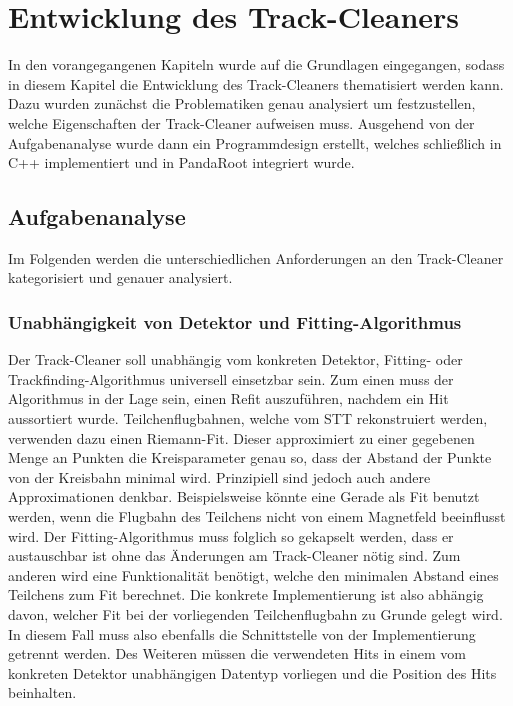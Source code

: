 \chapter{Entwicklung des Track-Cleaners}
In den vorangegangenen Kapiteln wurde auf die Grundlagen eingegangen, sodass in diesem Kapitel die Entwicklung des Track-Cleaners thematisiert werden kann. Dazu wurden zunächst die Problematiken genau analysiert um festzustellen, welche Eigenschaften der Track-Cleaner aufweisen muss. Ausgehend von der Aufgabenanalyse wurde dann ein Programmdesign erstellt, welches schließlich in C++ implementiert und in PandaRoot integriert wurde.

\section{Aufgabenanalyse}
Im Folgenden werden die unterschiedlichen Anforderungen an den Track-Cleaner kategorisiert und genauer analysiert.

\subsection{Unabhängigkeit von Detektor und Fitting-Algorithmus}
Der Track-Cleaner soll unabhängig vom konkreten Detektor, Fitting- oder Trackfinding-Algorithmus universell einsetzbar sein. Zum einen muss der Algorithmus in der Lage sein, einen Refit auszuführen, nachdem ein Hit aussortiert wurde. Teilchenflugbahnen, welche vom STT rekonstruiert werden, verwenden dazu einen Riemann-Fit. Dieser approximiert zu einer gegebenen Menge an Punkten die Kreisparameter genau so, dass der Abstand der Punkte von der Kreisbahn minimal wird. Prinzipiell sind jedoch auch andere Approximationen denkbar. Beispielsweise könnte eine Gerade als Fit benutzt werden, wenn die Flugbahn des Teilchens nicht von einem Magnetfeld beeinflusst wird. Der Fitting-Algorithmus muss folglich so gekapselt werden, dass er austauschbar ist ohne das Änderungen am Track-Cleaner nötig sind. Zum anderen wird eine Funktionalität benötigt, welche den minimalen Abstand eines Teilchens zum Fit berechnet. Die konkrete Implementierung ist also abhängig davon, welcher Fit bei der vorliegenden Teilchenflugbahn zu Grunde gelegt wird. In diesem Fall muss also ebenfalls die Schnittstelle von der Implementierung getrennt werden. Des Weiteren müssen die verwendeten Hits in einem vom konkreten Detektor unabhängigen Datentyp vorliegen und die Position des Hits beinhalten.

